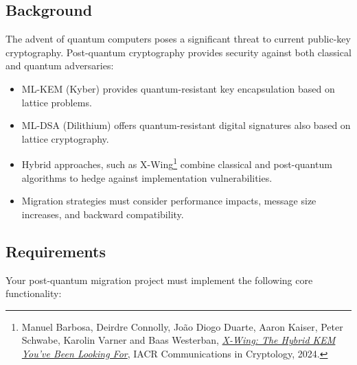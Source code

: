 \documentclass[10pt,a4paper,american]{article}
\begin{document}
\subsection*{Background}
The advent of quantum computers poses a significant threat to current public-key cryptography. Post-quantum cryptography provides security against both classical and quantum adversaries:
\begin{itemize}
	\item ML-KEM (Kyber) provides quantum-resistant key encapsulation based on lattice problems.
	\item ML-DSA (Dilithium) offers quantum-resistant digital signatures also based on lattice cryptography.
	\item Hybrid approaches, such as X-Wing\footnote{Manuel Barbosa, Deirdre Connolly, Jo\~ao Diogo Duarte, Aaron Kaiser, Peter Schwabe, Karolin Varner and Baas Westerban, \href{https://appliedcryptography.page/papers/\#xwing-hybrid}{\textit{X-Wing: The Hybrid KEM You've Been Looking For}}, IACR Communications in Cryptology, 2024.} combine classical and post-quantum algorithms to hedge against implementation vulnerabilities.
	\item Migration strategies must consider performance impacts, message size increases, and backward compatibility.
\end{itemize}

\subsection*{Requirements}
Your post-quantum migration project must implement the following core functionality:
\end{document}
